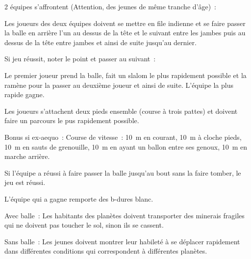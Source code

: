 \documentclass{grand-jeu}
\begin{document}
\begin{regles}
2 équipes s’affrontent (Attention, des jeunes de même tranche d'âge) :

Les joueurs des deux équipes doivent se mettre en file indienne et se faire passer la balle en arrière l’un au dessus de la tête et le suivant entre les jambes puis au dessus de la tête entre jambes et ainsi de suite jusqu’au dernier.

\vspace{0.2cm}

Si jeu réussit, noter le point et passer au suivant :

Le premier joueur prend la balle, fait un slalom le plus rapidement possible et la ramène pour la passer au deuxième joueur et ainsi de suite. L’équipe la plus rapide gagne.

Les joueurs s’attachent deux pieds ensemble (course à trois pattes) et doivent faire un parcours le pus rapidement possible.

\vspace{0.2cm}

Bonus si ex-aequo : Course de vitesse : 10 m en courant, 10 m à cloche pieds, 10 m en sauts de grenouille, 10 m en ayant un ballon entre ses genoux, 10 m en marche arrière.

Si l’équipe a réussi à faire passer la balle jusqu’au bout sans la faire tomber, le jeu est réussi.

L’équipe qui a gagne remporte des b-dures blanc.
\end{regles}

\begin{imaginaire}
Avec balle : Les habitants des planètes doivent transporter des minerais fragiles qui ne doivent pas toucher le sol, sinon ils se cassent.

Sans balle : Les jeunes doivent montrer leur habileté à se déplacer rapidement dans différentes conditions qui correspondent à différentes planètes.
\end{imaginaire}

\begin{moments-stop}
\end{moments-stop}
\end{document}
